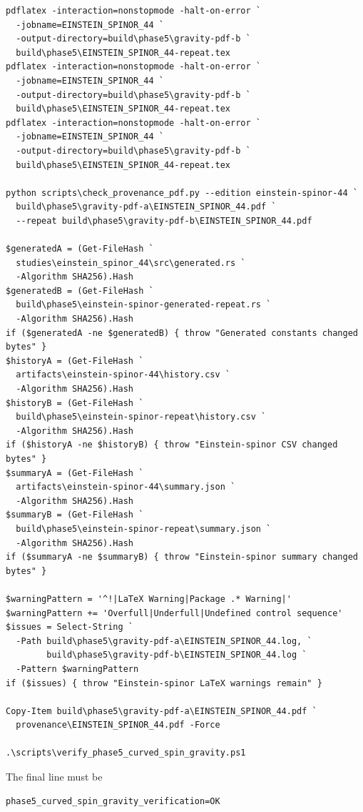 \documentclass[11pt]{article}
\begin{document}
\begin{Verbatim}[fontsize=\small]
pdflatex -interaction=nonstopmode -halt-on-error `
  -jobname=EINSTEIN_SPINOR_44 `
  -output-directory=build\phase5\gravity-pdf-b `
  build\phase5\EINSTEIN_SPINOR_44-repeat.tex
pdflatex -interaction=nonstopmode -halt-on-error `
  -jobname=EINSTEIN_SPINOR_44 `
  -output-directory=build\phase5\gravity-pdf-b `
  build\phase5\EINSTEIN_SPINOR_44-repeat.tex
pdflatex -interaction=nonstopmode -halt-on-error `
  -jobname=EINSTEIN_SPINOR_44 `
  -output-directory=build\phase5\gravity-pdf-b `
  build\phase5\EINSTEIN_SPINOR_44-repeat.tex

python scripts\check_provenance_pdf.py --edition einstein-spinor-44 `
  build\phase5\gravity-pdf-a\EINSTEIN_SPINOR_44.pdf `
  --repeat build\phase5\gravity-pdf-b\EINSTEIN_SPINOR_44.pdf

$generatedA = (Get-FileHash `
  studies\einstein_spinor_44\src\generated.rs `
  -Algorithm SHA256).Hash
$generatedB = (Get-FileHash `
  build\phase5\einstein-spinor-generated-repeat.rs `
  -Algorithm SHA256).Hash
if ($generatedA -ne $generatedB) { throw "Generated constants changed bytes" }
$historyA = (Get-FileHash `
  artifacts\einstein-spinor-44\history.csv `
  -Algorithm SHA256).Hash
$historyB = (Get-FileHash `
  build\phase5\einstein-spinor-repeat\history.csv `
  -Algorithm SHA256).Hash
if ($historyA -ne $historyB) { throw "Einstein-spinor CSV changed bytes" }
$summaryA = (Get-FileHash `
  artifacts\einstein-spinor-44\summary.json `
  -Algorithm SHA256).Hash
$summaryB = (Get-FileHash `
  build\phase5\einstein-spinor-repeat\summary.json `
  -Algorithm SHA256).Hash
if ($summaryA -ne $summaryB) { throw "Einstein-spinor summary changed bytes" }

$warningPattern = '^!|LaTeX Warning|Package .* Warning|'
$warningPattern += 'Overfull|Underfull|Undefined control sequence'
$issues = Select-String `
  -Path build\phase5\gravity-pdf-a\EINSTEIN_SPINOR_44.log, `
        build\phase5\gravity-pdf-b\EINSTEIN_SPINOR_44.log `
  -Pattern $warningPattern
if ($issues) { throw "Einstein-spinor LaTeX warnings remain" }

Copy-Item build\phase5\gravity-pdf-a\EINSTEIN_SPINOR_44.pdf `
  provenance\EINSTEIN_SPINOR_44.pdf -Force

.\scripts\verify_phase5_curved_spin_gravity.ps1
\end{Verbatim}

The final line must be

\begin{Verbatim}[fontsize=\small]
phase5_curved_spin_gravity_verification=OK
\end{Verbatim}
\end{document}
